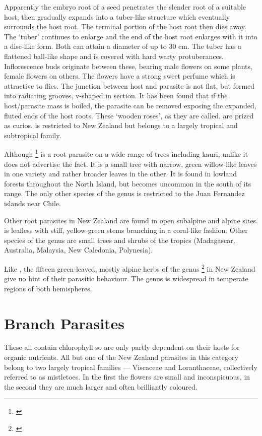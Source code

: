 Apparently the embryo root of a  seed penetrates the slender root of a suitable host, then gradually expands into a tuber-like structure which eventually surrounds the host root.
The terminal portion of the host root then dies away.
The `tuber' continues to enlarge and the end of the host root enlarges with it into a disc-like form.
Both can attain a diameter of up to 30 cm.
The tuber has a flattened ball-like shape and is covered with hard warty protuberances.
Inflorescence buds originate between these, bearing male flowers on some plants, female flowers on others.
The flowers have a strong sweet perfume which is attractive to flies.
The junction between host and parasite is not flat, but formed into radiating grooves, v-shaped in section.
It has been found that if the host/parasite mass is boiled, the parasite can be removed exposing the expanded, fluted ends of the host roots.
These `wooden roses', as they are called, are prized as curios.  is restricted to New Zealand but belongs to a largely tropical and subtropical family.

Although \footnote{\cite{philipson1959some}} is a root parasite on a wide range of trees including kauri, unlike  it does not advertise the fact.
It is a small tree with narrow, green willow-like leaves in one variety and rather broader leaves in the other.
It is found in lowland forests throughout the North Island, but becomes uncommon in the south of its range.
The only other species of the genus is restricted to the Juan Fernandez islands near Chile.

Other root parasites in New Zealand are found in open subalpine and alpine sites.  is leafless with stiff, yellow-green stems branching in a coral-like fashion.
Other species of the genus are small trees and shrubs of the tropics (Madagascar, Australia, Malaysia, New Caledonia, Polynesia).

Like , the fifteen green-leaved, mostly alpine herbs of the genus \footnote{\cite{philipson1959some}} in New Zealand give no hint of their parasitic behaviour.
The genus is widespread in temperate regions of both hemispheres.

\section{Branch Parasites}

These all contain chlorophyll so are only partly dependent on their hosts for organic nutrients.
All but one of the New Zealand parasites in this category belong to two largely tropical families --- Viscaceae and Loranthaceae, collectively referred to as mistletoes.
In the first the flowers are small and inconspicuous, in the second they are much larger and often brilliantly coloured.

